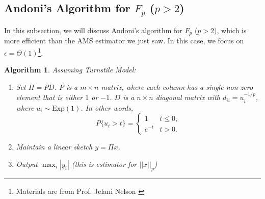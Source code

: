 \documentclass[11pt]{article}
\theoremstyle{plain}
\newtheorem{algorithm}{Algorithm}[section]
\begin{document}
\subsection{Andoni's Algorithm for $F_p$ ($p>2$)}
In this subsection, we will discuss Andoni's algorithm for $F_p$ ($p>2$), which 
is more efficient than the AMS estimator we just saw. In this case, we focus on 
$\epsilon=\Theta(1)$\footnote{Materials are from 
Prof. Jelani Nelson  \cite{Nel2015-web}}.

\begin{algorithm}
\label{al:andoni}
Assuming Turnstile Model:
\begin{enumerate}
	\item Set $\Pi=PD$. $P$ is a $m\times n$ matrix, where each column has a 
	single non-zero element that is either $1$ or $-1$. $D$ is a $n\times n$ 
	diagonal matrix with $d_{ii}=u_{i}^{-1/p}$, where $u_{i}\sim \text{Exp}(1)$. In 
	other words, 
	\[
	P\{u_{i}>t\}=\begin{cases}
	1 & t\le0,\\
	e^{-t} & t>0.
	\end{cases}
	\]
	\item Maintain a linear sketch $y=\Pi x$.
	\item Output $\max_{i}|y_i|$ (this is estimator for $||x||_p$)
\end{enumerate}
\end{algorithm}
\end{document}
